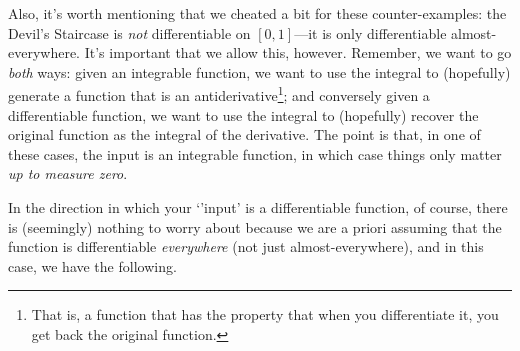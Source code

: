 Also, it's worth mentioning that we cheated a bit for these counter-examples:  the Devil's Staircase is \emph{not} differentiable on $[0,1]$---it is only differentiable almost-everywhere.  It's important that we allow this, however.  Remember, we want to go \emph{both} ways:  given an integrable function, we want to use the integral to (hopefully) generate a function that is an antiderivative\footnote{That is, a function that has the property that when you differentiate it, you get back the original function.}; and conversely given a differentiable function, we want to use the integral to (hopefully) recover the original function as the integral of the derivative.  The point is that, in one of these cases, the input is an integrable function, in which case things only matter \emph{up to measure zero}.

In the direction in which your `'input' is a differentiable function, of course, there is (seemingly) nothing to worry about because we are a priori assuming that the function is differentiable \emph{everywhere} (not just almost-everywhere), and in this case, we have the following.
